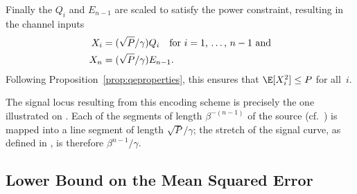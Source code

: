 Finally the $Q_i$ and $E_{n-1}$ are scaled to satisfy the power constraint,
resulting in the channel inputs
\begin{align}
  X_i &= (\sqrt{P}/\gamma) Q_i \quad
  \text{for $i = 1$, \dots, $n-1$ and} \nonumber\\
  X_n &= (\sqrt{P}/\gamma) E_{n-1}.
  \label{eq:Xdef}
\end{align}
Following Proposition~\ref{prop:qeproperties}, this ensures that $\E[X_i^2] \le
P$ for all~$i$. 

\begin{remark}
  \label{rem:sqgeometry}
  The signal locus resulting from this encoding scheme is precisely the one
  illustrated on . Each of the segments of length
  $\beta^{-(n-1)}$ of the source (cf.~) is mapped into a
  line segment of length $\sqrt{P}/\gamma$; the stretch of the signal curve, as
  defined in , is therefore $\beta^{n-1}/\gamma$.
\end{remark}



\subsection{Lower Bound on the Mean Squared Error}\label{sec:scalarlowerbound}

